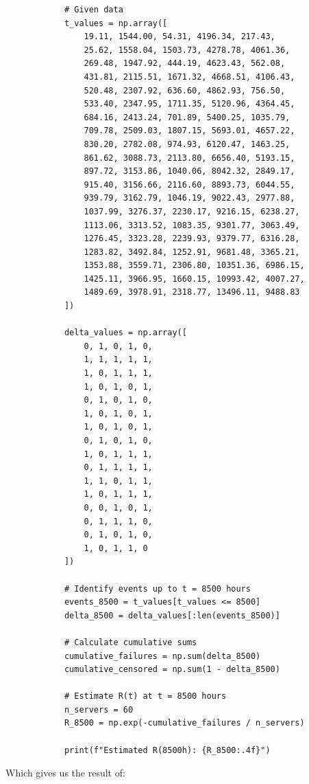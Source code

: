 \documentclass{article}
\begin{document}
\begin{enumerate}[label=(\alph*)]
\begin{enumerate}[label=(\alph*)]
\begin{flushleft}
\begin{lstlisting}
            # Given data
            t_values = np.array([
                19.11, 1544.00, 54.31, 4196.34, 217.43,
                25.62, 1558.04, 1503.73, 4278.78, 4061.36,
                269.48, 1947.92, 444.19, 4623.43, 562.08,
                431.81, 2115.51, 1671.32, 4668.51, 4106.43,
                520.48, 2307.92, 636.60, 4862.93, 756.50,
                533.40, 2347.95, 1711.35, 5120.96, 4364.45,
                684.16, 2413.24, 701.89, 5400.25, 1035.79,
                709.78, 2509.03, 1807.15, 5693.01, 4657.22,
                830.20, 2782.08, 974.93, 6120.47, 1463.25,
                861.62, 3088.73, 2113.80, 6656.40, 5193.15,
                897.72, 3153.86, 1040.06, 8042.32, 2849.17,
                915.40, 3156.66, 2116.60, 8893.73, 6044.55,
                939.79, 3162.79, 1046.19, 9022.43, 2977.88,
                1037.99, 3276.37, 2230.17, 9216.15, 6238.27,
                1113.06, 3313.52, 1083.35, 9301.77, 3063.49,
                1276.45, 3323.28, 2239.93, 9379.77, 6316.28,
                1283.82, 3492.84, 1252.91, 9681.48, 3365.21,
                1353.88, 3559.71, 2306.80, 10351.36, 6986.15,
                1425.11, 3966.95, 1660.15, 10993.42, 4007.27,
                1489.69, 3978.91, 2318.77, 13496.11, 9488.83
            ])
            
            delta_values = np.array([
                0, 1, 0, 1, 0,
                1, 1, 1, 1, 1,
                1, 0, 1, 1, 1,
                1, 0, 1, 0, 1,
                0, 1, 0, 1, 0,
                1, 0, 1, 0, 1,
                1, 0, 1, 0, 1,
                0, 1, 0, 1, 0,
                1, 0, 1, 1, 1,
                0, 1, 1, 1, 1,
                1, 1, 0, 1, 1,
                1, 0, 1, 1, 1,
                0, 0, 1, 0, 1,
                0, 1, 1, 1, 0,
                0, 1, 0, 1, 0,
                1, 0, 1, 1, 0
            ])
            
            # Identify events up to t = 8500 hours
            events_8500 = t_values[t_values <= 8500]
            delta_8500 = delta_values[:len(events_8500)]
            
            # Calculate cumulative sums
            cumulative_failures = np.sum(delta_8500)
            cumulative_censored = np.sum(1 - delta_8500)
            
            # Estimate R(t) at t = 8500 hours
            n_servers = 60
            R_8500 = np.exp(-cumulative_failures / n_servers)
            
            print(f"Estimated R(8500h): {R_8500:.4f}")
            \end{lstlisting}
        Which gives us the result of:
        
        \end{flushleft}
        
\end{enumerate}

\end{enumerate}
\end{document}
